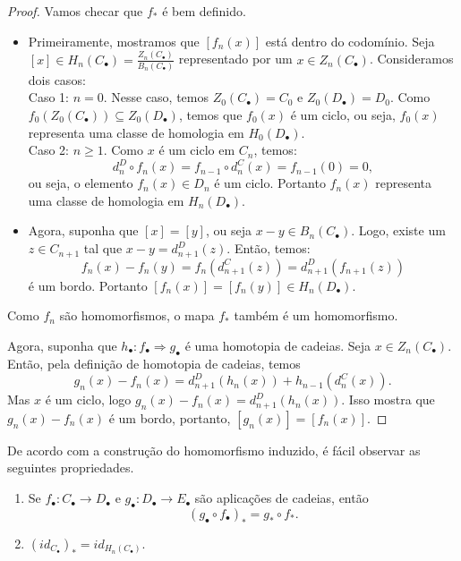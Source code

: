 \begin{proof}
    Vamos checar que $f_*$ é bem definido.
    \begin{itemize}
        \item Primeiramente, mostramos que $[f_n(x)]$ está dentro do codomínio. Seja $[x]\in H_n(C_\bullet)=\frac{Z_n(C_\bullet)}{B_n(C_\bullet)}$ representado por um $x\in Z_n(C_\bullet)$. Consideramos dois casos:\\
        Caso 1: $n=0$. Nesse caso, temos $Z_0(C_\bullet)=C_0$ e $Z_0(D_\bullet)=D_0$. Como $f_0(Z_0(C_\bullet))\subseteq Z_0(D_\bullet)$, temos que $f_0(x)$ é um ciclo, ou seja, $f_0(x)$ representa uma classe de homologia em $H_0(D_\bullet)$.\\
        Caso 2: $n\ge 1$. Como $x$ é um ciclo em $C_n$, temos:
        \[d_n^D\circ f_n(x)=f_{n-1}\circ d_n^C(x)=f_{n-1}(0)=0,\]
        ou seja, o elemento $f_n(x)\in D_n$ é um ciclo. Portanto $f_n(x)$ representa uma classe de homologia em $H_n(D_\bullet)$.
        \item Agora, suponha que $[x]=[y]$, ou seja $x-y\in B_n(C_\bullet)$. Logo, existe um $z\in C_{n+1}$ tal que $x-y=d_{n+1}^D(z)$. Então, temos: 
        \[f_n(x)-f_n(y)=f_n(d_{n+1}^C(z))=d_{n+1}^D (f_{n+1}(z))\]
        é um bordo. Portanto $[f_n(x)]=[f_n(y)]\in H_n(D_\bullet).$
    \end{itemize}
    Como $f_n$ são homomorfismos, o mapa $f_*$ também é um homomorfismo. 

    Agora, suponha que $h_\bullet: f_\bullet \Rightarrow g_\bullet$ é uma homotopia de cadeias. Seja $x\in Z_n(C_\bullet)$. Então, pela definição de homotopia de cadeias, temos 
    \[g_n(x)-f_n(x)=d_{n+1}^D(h_n(x))+h_{n-1}(d_n^C(x)).\]
    Mas $x$ é um ciclo, logo $g_n(x)-f_n(x)=d_{n+1}^D(h_n(x))$. Isso mostra que $g_n(x)-f_n(x)$ é um bordo, portanto, $[g_n(x)]=[f_n(x)]$.
\end{proof}

De acordo com a construção do homomorfismo induzido, é fácil observar as seguintes propriedades.

\begin{corol}
    \begin{enumerate}
        \item Se $f_\bullet: C_\bullet\rightarrow D_\bullet$ e $g_\bullet:D_\bullet\rightarrow E_\bullet$ são aplicações de cadeias, então 
        \[(g_\bullet\circ f_\bullet)_*=g_*\circ f_*.\]
        \item $(id_{C_\bullet})_*=id_{H_n(C_\bullet)}$.
    \end{enumerate}

\end{corol}

